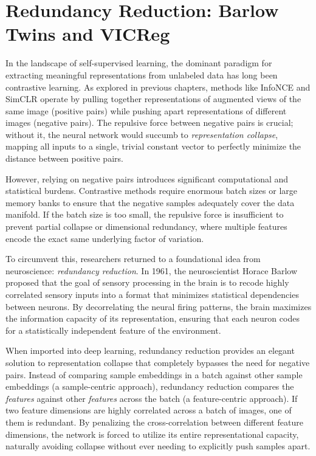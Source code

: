 \chapter{Redundancy Reduction: Barlow Twins and VICReg}
\label{ch:barlow_twins}

In the landscape of self-supervised learning, the dominant paradigm for extracting meaningful representations from unlabeled data has long been contrastive learning. As explored in previous chapters, methods like InfoNCE and SimCLR operate by pulling together representations of augmented views of the same image (positive pairs) while pushing apart representations of different images (negative pairs). The repulsive force between negative pairs is crucial; without it, the neural network would succumb to \emph{representation collapse}, mapping all inputs to a single, trivial constant vector to perfectly minimize the distance between positive pairs. 

However, relying on negative pairs introduces significant computational and statistical burdens. Contrastive methods require enormous batch sizes or large memory banks to ensure that the negative samples adequately cover the data manifold. If the batch size is too small, the repulsive force is insufficient to prevent partial collapse or dimensional redundancy, where multiple features encode the exact same underlying factor of variation. 

To circumvent this, researchers returned to a foundational idea from neuroscience: \emph{redundancy reduction}. In 1961, the neuroscientist Horace Barlow proposed that the goal of sensory processing in the brain is to recode highly correlated sensory inputs into a format that minimizes statistical dependencies between neurons. By decorrelating the neural firing patterns, the brain maximizes the information capacity of its representation, ensuring that each neuron codes for a statistically independent feature of the environment.

When imported into deep learning, redundancy reduction provides an elegant solution to representation collapse that completely bypasses the need for negative pairs. Instead of comparing sample embeddings in a batch against other sample embeddings (a sample-centric approach), redundancy reduction compares the \emph{features} against other \emph{features} across the batch (a feature-centric approach). If two feature dimensions are highly correlated across a batch of images, one of them is redundant. By penalizing the cross-correlation between different feature dimensions, the network is forced to utilize its entire representational capacity, naturally avoiding collapse without ever needing to explicitly push samples apart.

